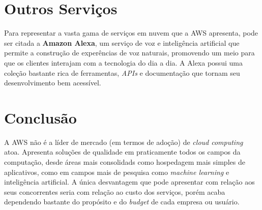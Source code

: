\section{Outros Serviços}

Para representar a vasta gama de serviços em nuvem que a AWS apresenta, pode ser citada a \textbf{Amazon Alexa}, um serviço de voz e inteligência artificial que permite a construção de experências de voz naturais, promovendo um meio para que os clientes interajam com a tecnologia do dia a dia. A Alexa possui uma coleção bastante rica de ferramentas, \textit{APIs} e documentação que tornam seu desenvolvimento bem acessível.


\section{Conclusão}

A AWS não é a líder de mercado (em termos de adoção) de \textit{cloud computing} atoa. Apresenta soluções de qualidade em praticamente todos os campos da computação, desde áreas mais consolidads como hospedagem mais simples de aplicativos, como em campos mais de pesquisa como \textit{machine learning} e inteligência artificial. A única desvantagem que pode apresentar com relação aos seus concorrentes seria com relação ao custo dos serviços, porém acaba dependendo bastante do propósito e do \textit{budget} de cada empresa ou usuário.
